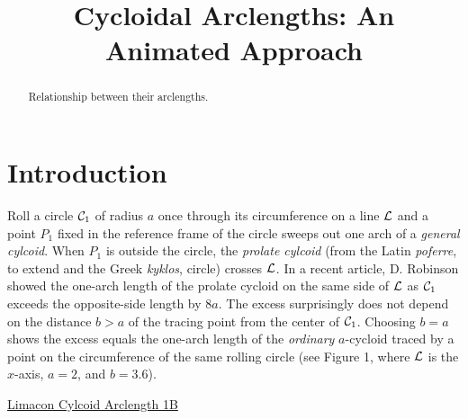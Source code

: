 \documentclass{ximera}
\title{Cycloidal Arclengths: An Animated Approach}
\begin{document}
\begin{abstract}
Relationship between their arclengths.
\end{abstract}
\maketitle
 
\section{Introduction}


Roll a circle ${\cal C}_1$ of radius $a$ once through its circumference on a line ${\cal L}$ and a point $P_1$ fixed in the reference frame of the circle sweeps out one arch of a \emph{general cylcoid}. When $P_1$ is outside the circle, the \emph{prolate cylcoid} (from the Latin \emph{poferre}, to extend and the Greek \emph{kyklos}, circle) crosses ${\cal L}$. In a recent article,  D. Robinson showed the one-arch length of the prolate cycloid on the same side of ${\cal L}$ as ${\cal C}_1$ exceeds the opposite-side length by $8a$. The excess surprisingly does not depend on the distance $b>a$ of the tracing point from the center of ${\cal C}_1$.  Choosing $b=a$ shows the excess equals the one-arch length of the \emph{ordinary} $a$-cycloid traced by a point on the circumference of the same rolling circle (see Figure 1, where ${\cal L}$ is the $x$-axis, $a=2$, and $b=3.6$).

\begin{onlineOnly}
    \begin{center}
\end{center}
\end{onlineOnly}

\href{https://www.desmos.com/calculator/ty0hdz7uyj}{Limacon Cylcoid Arclength 1B}

\end{document}

